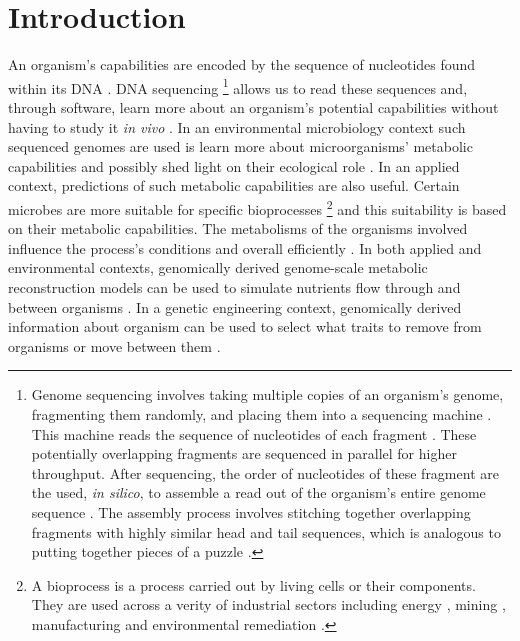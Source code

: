 \chapter{Introduction}

An organism's capabilities are encoded by the sequence of nucleotides found within its DNA \cite{crick1970central}. DNA sequencing \footnote{Genome sequencing involves taking multiple copies of an organism's genome, fragmenting them randomly, and placing them into a sequencing machine \cite{shendure2017dna}. This machine reads the sequence of nucleotides of each fragment  \cite{shendure2017dna}. These potentially overlapping fragments are sequenced in parallel for higher throughput. After sequencing, the order of nucleotides of these fragment are the used, \textit{in silico}, to assemble a read out of the organism's entire genome sequence \cite{wajid2012review}. The assembly process involves stitching together overlapping fragments with highly similar head and tail sequences, which is analogous to putting together pieces of a puzzle \cite{wajid2012review}.} allows us to read these sequences and, through software, learn more about an organism's potential capabilities without having to study it \textit{in vivo} \cite{de2012bioinformatic}. In an environmental microbiology context such sequenced genomes are used is learn more about microorganisms' metabolic capabilities and possibly shed light on their ecological role \cite{de2012bioinformatic}. In an applied context, predictions of such metabolic capabilities are also useful. Certain microbes are more suitable for specific bioprocesses \footnote{A bioprocess is a process carried out by living cells or their components. They are used across a verity of industrial sectors including energy \cite{deublein2011biogas}, mining \cite{dew1997biox}, manufacturing \cite{thodey2014microbial} and environmental remediation \cite{alexander1999biodegradation}.} and this suitability is based on their metabolic capabilities. The metabolisms of the organisms involved influence the process's conditions and overall efficiently \cite{doran1995bioprocess,liu2016bioprocess}. In both applied and environmental contexts, genomically derived genome-scale metabolic reconstruction models can be used to simulate nutrients flow through and between organisms \cite{magnusdottir2017generation, arkin2018kbase, faria2018improving}. In a genetic engineering context, genomically derived information about organism can be used to select what traits to remove from organisms or move between them \cite{strohl2001biochemical}.

